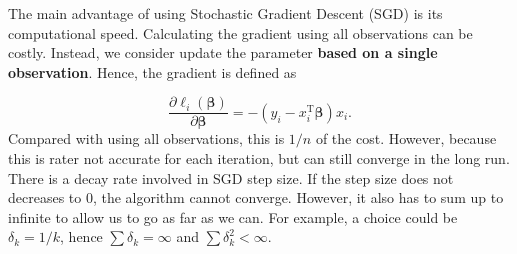 \documentclass[
]{book}
\theoremstyle{definition}
\theoremstyle{definition}
\theoremstyle{definition}
\theoremstyle{definition}
\theoremstyle{remark}
\begin{document}
The main advantage of using Stochastic Gradient Descent (SGD) is its computational speed. Calculating the gradient using all observations can be costly. Instead, we consider update the parameter \textbf{based on a single observation}. Hence, the gradient is defined as

\[
\frac{\partial \ell_i(\boldsymbol \beta)}{\partial \boldsymbol \beta} = - (y_i - x_i^\text{T} \boldsymbol \beta) x_i.
\]
Compared with using all observations, this is \(1/n\) of the cost. However, because this is rater not accurate for each iteration, but can still converge in the long run. There is a decay rate involved in SGD step size. If the step size does not decreases to 0, the algorithm cannot converge. However, it also has to sum up to infinite to allow us to go as far as we can. For example, a choice could be \(\delta_k = 1/k\), hence \(\sum \delta_k = \infty\) and \(\sum \delta_k^2 < \infty\).
\end{document}
